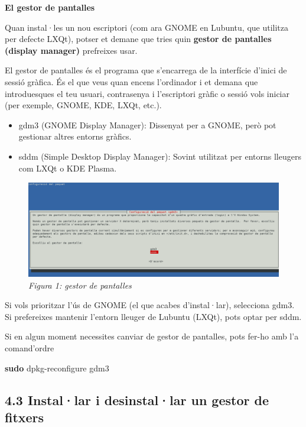 \documentclass[
  a4paper,
]{article}
\newenvironment{Shaded}{\begin{snugshade}}{\end{snugshade}}
\newcommand{\FunctionTok}[1]{\textcolor[rgb]{0.13,0.29,0.53}{\textbf{#1}}}
\newcommand{\NormalTok}[1]{#1}
\providecommand{\tightlist}{%
  \setlength{\itemsep}{0pt}\setlength{\parskip}{0pt}}
\begin{document}
\textbf{El gestor de pantalles}

Quan instal·les un nou escriptori (com ara GNOME en Lubuntu, que
utilitza per defecte LXQt), potser et demane que tries quin
\textbf{gestor de pantalles (display manager)} prefreixes usar.

El gestor de pantalles és el programa que s'encarrega de la interfície
d'inici de sessió gràfica. És el que veus quan encens l'ordinador i et
demana que introduesques el teu usuari, contrasenya i l'escriptori
gràfic o sessió vols iniciar (per exemple, GNOME, KDE, LXQt, etc.).

\begin{itemize}
\tightlist
\item
  gdm3 (GNOME Display Manager): Dissenyat per a GNOME, però pot
  gestionar altres entorns gràfics.
\item
  sddm (Simple Desktop Display Manager): Sovint utilitzat per entorns
  lleugers com LXQt o KDE Plasma.
\end{itemize}

\begin{figure}
\centering
\includegraphics{png/avisGestorPantalla.png}
\caption{\emph{Figura 1: gestor de pantalles}}
\end{figure}

Si vols prioritzar l'ús de GNOME (el que acabes d'instal·lar),
selecciona gdm3. Si prefereixes mantenir l'entorn lleuger de Lubuntu
(LXQt), pots optar per sddm.

Si en algun moment necessites canviar de gestor de pantalles, pots
fer-ho amb l'a comand'ordre

\begin{Shaded}
\begin{Highlighting}[]
\FunctionTok{sudo}\NormalTok{ dpkg{-}reconfigure gdm3}
\end{Highlighting}
\end{Shaded}

\subsection{4.3 Instal·lar i desinstal·lar un gestor de
fitxers}\label{installar-i-desinstallar-un-gestor-de-fitxers}
\end{document}
